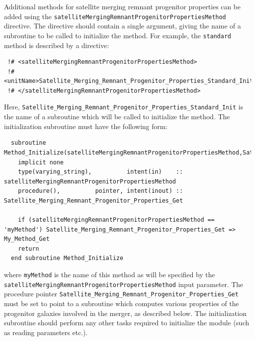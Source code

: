 Additional methods for satellite merging remnant progenitor properties can be added using the {\tt satelliteMergingRemnantProgenitorPropertiesMethod} directive. The directive should contain a single argument, giving the name of a subroutine to be called to initialize the method. For example, the {\tt standard} method is described by a directive:
\begin{verbatim}
 !# <satelliteMergingRemnantProgenitorPropertiesMethod>
 !#  <unitName>Satellite_Merging_Remnant_Progenitor_Properties_Standard_Init</unitName>
 !# </satelliteMergingRemnantProgenitorPropertiesMethod>
\end{verbatim}
Here, {\tt Satellite\_Merging\_Remnant\_Progenitor\_Properties\_Standard\_Init} is the name of a subroutine which will be called to initialize the method. The initialization subroutine must have the following form:
\begin{verbatim}
  subroutine Method_Initialize(satelliteMergingRemnantProgenitorPropertiesMethod,Satellite_Merging_Remnant_Progenitor_Properties_Get)
    implicit none
    type(varying_string),          intent(in)    :: satelliteMergingRemnantProgenitorPropertiesMethod
    procedure(),          pointer, intent(inout) :: Satellite_Merging_Remnant_Progenitor_Properties_Get
    
    if (satelliteMergingRemnantProgenitorPropertiesMethod == 'myMethod') Satellite_Merging_Remnant_Progenitor_Properties_Get => My_Method_Get
    return
  end subroutine Method_Initialize
\end{verbatim}
where {\tt myMethod} is the name of this method as will be specified by the {\tt satelliteMergingRemnantProgenitorPropertiesMethod} input parameter. The procedure pointer {\tt Satellite\_Merging\_Remnant\_Progenitor\_Properties\_Get} must be set to point to a subroutine which computes various properties of the progenitor galaxies involved in the merger, as described below. The initialization subroutine should perform any other tasks required to initialize the module (such as reading parameters etc.).

